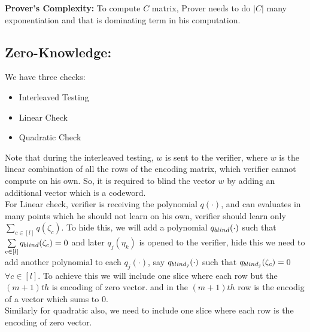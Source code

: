 \textbf{Prover's Complexity:}
 To compute $C$ matrix, Prover needs to do $|C|$ many exponentiation and that is dominating term in his computation.
 
 \subsection{Zero-Knowledge:} We have three checks:
 \begin{itemize}
 	\item Interleaved Testing
 	\item Linear Check
 	\item Quadratic Check
 \end{itemize}
Note that during the interleaved testing, $w$ is sent to the verifier, where $w$ is the linear combination of all the rows of the encoding matrix, which verifier cannot compute on his own. So, it is required to blind the vector $w$ by adding an additional vector which is a codeword.\\

For Linear check, verifier is receiving the polynomial $q(\cdot)$, and can evaluates in many points which he should not learn on his own, verifier should learn only $\sum\limits_{c\in[l]}q(\zeta_c)$. To hide this, we will add a polynomial $q_{blind}(\cdot)$ such that $\sum\limits_{c\in[l]}q_{blind}(\zeta_c)=0$ and later $q_j(\eta_k)$ is opened to the verifier, hide this we need to add another polynomial to each $q_j(\cdot)$, say $q_{{blind}_j}(\cdot)$ such that $q_{{blind}_j}(\zeta_c)=0$ $\forall c\in [l]$. To achieve this we will include one slice where each row but the $(m+1)th$ is encoding of zero vector. and in the $(m+1)th$ row is the encodig of a vector which sums to 0.\\

Similarly for quadratic also, we need to include one slice where each row  is the encoding of zero vector.

